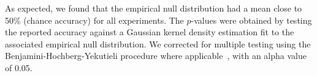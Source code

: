 As expected, we found that the empirical null distribution had a mean close to 
50\% (chance accuracy) for all experiments. The $p$-values were obtained by 
testing the reported accuracy against a Gaussian kernel density estimation fit 
to the associated empirical null distribution. We corrected for multiple 
testing using the Benjamini-Hochberg-Yekutieli procedure where 
applicable~\cite{benjamini2001control}, with an alpha value of 0.05.
